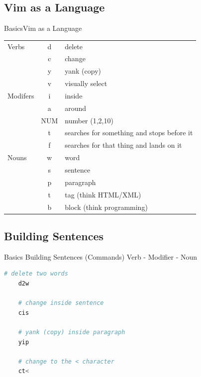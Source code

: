 \documentclass{beamer}
\begin{document}
\subsection{Vim as a Language}
\begin{frame}[c]{Basics}{Vim as a Language}
\begin{table}
    \centering
    \label{tab:label}
    \begin{tabular}{l|c|l}
        Verbs    & d   & delete \\
                 & c   & change           \\
                 & y   & yank (copy)      \\
                 & v   & visually select  \\
        \hline
        Modifers & i   & inside \\
                 & a   & around \\
                 & NUM & number (1,2,10) \\
                 & t   & searches for something and stops before it \\
                 & f   & searches for that thing and lands on it \\
        \hline
        Nouns    & w   & word \\
                 & s   & sentence \\
                 & p   & paragraph \\
                 & t   & tag (think HTML/XML) \\
                 & b   & block (think programming) \\
    \end{tabular}
\end{table}
\end{frame}


\subsection{Building Sentences}
\begin{frame}[fragile] {Basics} {Building Sentences (Commands)}
    \centering
    Verb - Modifier - Noun

    \begin{lstlisting}[language=sh]
    # delete two words
    d2w

    # change inside sentence
    cis

    # yank (copy) inside paragraph 
    yip

    # change to the < character
    ct<
    \end{lstlisting}
\end{frame}
\end{document}
